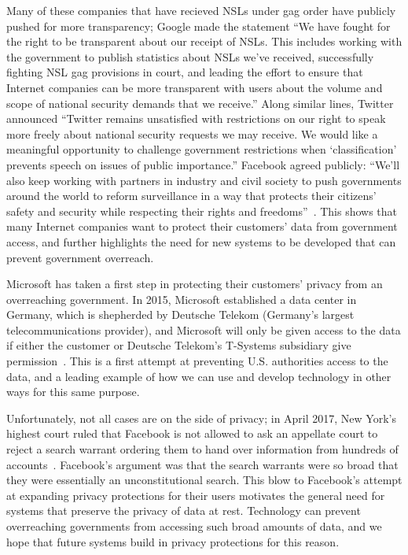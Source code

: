 Many of these companies that have recieved NSLs under gag order have publicly pushed for more transparency; Google made the statement ``We have fought for the right to be transparent about our receipt of NSLs. This includes working with the government to publish statistics about NSLs we’ve received, successfully fighting NSL gag provisions in court, and leading the effort to ensure that Internet companies can be more transparent with users about the volume and scope of national security demands that we receive.'' Along similar lines, Twitter announced ``Twitter remains unsatisfied with restrictions on our right to speak more freely about national security requests we may receive. We would like a meaningful opportunity to challenge government restrictions when ‘classification’ prevents speech on issues of public importance.''  Facebook agreed publicly: ``We'll also keep working with partners in industry and civil society to push governments around the world to reform surveillance in a way that protects their citizens’ safety and security while respecting their rights and freedoms''~\cite{cloudflare_gag}.  This shows that many Internet companies want to protect their customers' data from government access, and further highlights the need for new systems to be developed that can prevent government overreach.

Microsoft has taken a first step in protecting their customers' privacy from an overreaching government.  In 2015, Microsoft established a data center in Germany, which is shepherded by Deutsche Telekom (Germany's largest telecommunications provider), and Microsoft will only be given access to the data if either the customer or Deutsche Telekom's T-Systems subsidiary give permission~\cite{microsoft_germany}.  This is a first attempt at preventing U.S. authorities access to the data, and a leading example of how we can use and develop technology in other ways for this same purpose.

Unfortunately, not all cases are on the side of privacy; in April 2017, New York's highest court ruled that Facebook is not allowed to ask an appellate court to reject a search warrant ordering them to hand over information from hundreds of accounts~\cite{facebook_ny}.  Facebook's argument was that the search warrants were so broad that they were essentially an unconstitutional search.  This blow to Facebook's attempt at expanding privacy protections for their users motivates the general need for systems that preserve the privacy of data at rest. Technology can prevent overreaching governments from accessing such broad amounts of data, and we hope that future systems build in privacy protections for this reason. 

